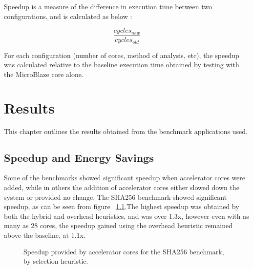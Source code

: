 \documentclass{UoYCSproject}
\begin{document}
Speedup is a measure of the difference in execution time between two configurations, and is calculated as below
\cite{computer-arch}:

\[\frac{cycles_{new}}{cycles_{old}}\]

For each configuration (number of cores, method of analysis, etc), the speedup was calculated relative to the baseline execution
time obtained by testing with the MicroBlaze core alone.

\chapter{Results}

This chapter outlines the results obtained from the benchmark applications used.

\section{Speedup and Energy Savings}

Some of the benchmarks showed significant speedup when accelerator cores were added, while in others the addition of
accelerator cores either slowed down the system or provided no change. The SHA256 benchmark showed significant speedup,
as can be seen from figure ~\ref{fig:speedupSHA256}.The highest speedup was obtained by both the hybrid and overhead heuristics,
and was over 1.3x, however even with as many as 28 cores, the speedup gained using the overhead heuristic remained above the
baseline, at 1.1x.

\begin{figure}[H]
\caption{Speedup provided by accelerator cores for the SHA256 benchmark, by selection heuristic.}
\label{fig:speedupSHA256}
\end{figure}
\end{document}
